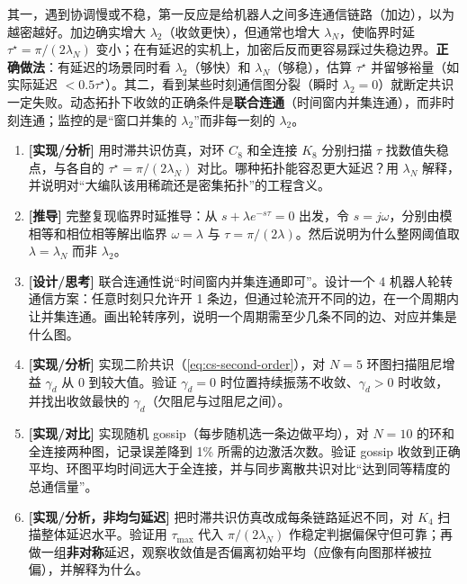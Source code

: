 \begin{pitfall}
其一，遇到协调慢或不稳，第一反应是给机器人之间多连通信链路（加边），以为越密越好。加边确实增大 $\lambda_2$（收敛更快），但通常也增大 $\lambda_N$，使临界时延 $\tau^\star=\pi/(2\lambda_N)$ 变小；在有延迟的实机上，加密后反而更容易踩过失稳边界。\textbf{正确做法}：有延迟的场景同时看 $\lambda_2$（够快）和 $\lambda_N$（够稳），估算 $\tau^\star$ 并留够裕量（如实际延迟 $<0.5\tau^\star$）。其二，看到某些时刻通信图分裂（瞬时 $\lambda_2=0$）就断定共识一定失败。动态拓扑下收敛的正确条件是\textbf{联合连通}（时间窗内并集连通），而非时刻连通；监控的是“窗口并集的 $\lambda_2$”而非每一刻的 $\lambda_2$。
\end{pitfall}

\begin{practice}
\begin{enumerate}
  \item \textbf{[实现/分析]} 用时滞共识仿真，对环 $C_8$ 和全连接 $K_8$ 分别扫描 $\tau$ 找数值失稳点，与各自的 $\tau^\star=\pi/(2\lambda_N)$ 对比。哪种拓扑能容忍更大延迟？用 $\lambda_N$ 解释，并说明对“大编队该用稀疏还是密集拓扑”的工程含义。
  \item \textbf{[推导]} 完整复现临界时延推导：从 $s+\lambda e^{-s\tau}=0$ 出发，令 $s=j\omega$，分别由模相等和相位相等解出临界 $\omega=\lambda$ 与 $\tau=\pi/(2\lambda)$。然后说明为什么整网阈值取 $\lambda=\lambda_N$ 而非 $\lambda_2$。
  \item \textbf{[设计/思考]} 联合连通性说“时间窗内并集连通即可”。设计一个 4 机器人轮转通信方案：任意时刻只允许开 1 条边，但通过轮流开不同的边，在一个周期内让并集连通。画出轮转序列，说明一个周期需至少几条不同的边、对应并集是什么图。
  \item \textbf{[实现/分析]} 实现二阶共识（\cref{eq:cs-second-order}），对 $N=5$ 环图扫描阻尼增益 $\gamma_d$ 从 0 到较大值。验证 $\gamma_d=0$ 时位置持续振荡不收敛、$\gamma_d>0$ 时收敛，并找出收敛最快的 $\gamma_d$（欠阻尼与过阻尼之间）。
  \item \textbf{[实现/对比]} 实现随机 gossip（每步随机选一条边做平均），对 $N=10$ 的环和全连接两种图，记录误差降到 1\% 所需的边激活次数。验证 gossip 收敛到正确平均、环图平均时间远大于全连接，并与同步离散共识对比“达到同等精度的总通信量”。
  \item \textbf{[实现/分析，非均匀延迟]} 把时滞共识仿真改成每条链路延迟不同，对 $K_4$ 扫描整体延迟水平。验证用 $\tau_{\max}$ 代入 $\pi/(2\lambda_N)$ 作稳定判据偏保守但可靠；再做一组\textbf{非对称}延迟，观察收敛值是否偏离初始平均（应像有向图那样被拉偏），并解释为什么。
\end{enumerate}
\end{practice}

